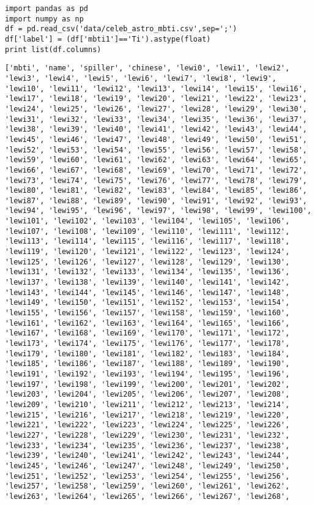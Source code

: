 \documentclass[12pt,fleqn]{article}\usepackage{../common}
\begin{document}
\begin{verbatim}
import pandas as pd
import numpy as np
df = pd.read_csv('data/celeb_astro_mbti.csv',sep=';')
df['label'] = (df['mbti1']=='Ti').astype(float)
print list(df.columns)
\end{verbatim}

\begin{verbatim}
['mbti', 'name', 'spiller', 'chinese', 'lewi0', 'lewi1', 'lewi2', 'lewi3', 'lewi4', 'lewi5', 'lewi6', 'lewi7', 'lewi8', 'lewi9', 'lewi10', 'lewi11', 'lewi12', 'lewi13', 'lewi14', 'lewi15', 'lewi16', 'lewi17', 'lewi18', 'lewi19', 'lewi20', 'lewi21', 'lewi22', 'lewi23', 'lewi24', 'lewi25', 'lewi26', 'lewi27', 'lewi28', 'lewi29', 'lewi30', 'lewi31', 'lewi32', 'lewi33', 'lewi34', 'lewi35', 'lewi36', 'lewi37', 'lewi38', 'lewi39', 'lewi40', 'lewi41', 'lewi42', 'lewi43', 'lewi44', 'lewi45', 'lewi46', 'lewi47', 'lewi48', 'lewi49', 'lewi50', 'lewi51', 'lewi52', 'lewi53', 'lewi54', 'lewi55', 'lewi56', 'lewi57', 'lewi58', 'lewi59', 'lewi60', 'lewi61', 'lewi62', 'lewi63', 'lewi64', 'lewi65', 'lewi66', 'lewi67', 'lewi68', 'lewi69', 'lewi70', 'lewi71', 'lewi72', 'lewi73', 'lewi74', 'lewi75', 'lewi76', 'lewi77', 'lewi78', 'lewi79', 'lewi80', 'lewi81', 'lewi82', 'lewi83', 'lewi84', 'lewi85', 'lewi86', 'lewi87', 'lewi88', 'lewi89', 'lewi90', 'lewi91', 'lewi92', 'lewi93', 'lewi94', 'lewi95', 'lewi96', 'lewi97', 'lewi98', 'lewi99', 'lewi100', 'lewi101', 'lewi102', 'lewi103', 'lewi104', 'lewi105', 'lewi106', 'lewi107', 'lewi108', 'lewi109', 'lewi110', 'lewi111', 'lewi112', 'lewi113', 'lewi114', 'lewi115', 'lewi116', 'lewi117', 'lewi118', 'lewi119', 'lewi120', 'lewi121', 'lewi122', 'lewi123', 'lewi124', 'lewi125', 'lewi126', 'lewi127', 'lewi128', 'lewi129', 'lewi130', 'lewi131', 'lewi132', 'lewi133', 'lewi134', 'lewi135', 'lewi136', 'lewi137', 'lewi138', 'lewi139', 'lewi140', 'lewi141', 'lewi142', 'lewi143', 'lewi144', 'lewi145', 'lewi146', 'lewi147', 'lewi148', 'lewi149', 'lewi150', 'lewi151', 'lewi152', 'lewi153', 'lewi154', 'lewi155', 'lewi156', 'lewi157', 'lewi158', 'lewi159', 'lewi160', 'lewi161', 'lewi162', 'lewi163', 'lewi164', 'lewi165', 'lewi166', 'lewi167', 'lewi168', 'lewi169', 'lewi170', 'lewi171', 'lewi172', 'lewi173', 'lewi174', 'lewi175', 'lewi176', 'lewi177', 'lewi178', 'lewi179', 'lewi180', 'lewi181', 'lewi182', 'lewi183', 'lewi184', 'lewi185', 'lewi186', 'lewi187', 'lewi188', 'lewi189', 'lewi190', 'lewi191', 'lewi192', 'lewi193', 'lewi194', 'lewi195', 'lewi196', 'lewi197', 'lewi198', 'lewi199', 'lewi200', 'lewi201', 'lewi202', 'lewi203', 'lewi204', 'lewi205', 'lewi206', 'lewi207', 'lewi208', 'lewi209', 'lewi210', 'lewi211', 'lewi212', 'lewi213', 'lewi214', 'lewi215', 'lewi216', 'lewi217', 'lewi218', 'lewi219', 'lewi220', 'lewi221', 'lewi222', 'lewi223', 'lewi224', 'lewi225', 'lewi226', 'lewi227', 'lewi228', 'lewi229', 'lewi230', 'lewi231', 'lewi232', 'lewi233', 'lewi234', 'lewi235', 'lewi236', 'lewi237', 'lewi238', 'lewi239', 'lewi240', 'lewi241', 'lewi242', 'lewi243', 'lewi244', 'lewi245', 'lewi246', 'lewi247', 'lewi248', 'lewi249', 'lewi250', 'lewi251', 'lewi252', 'lewi253', 'lewi254', 'lewi255', 'lewi256', 'lewi257', 'lewi258', 'lewi259', 'lewi260', 'lewi261', 'lewi262', 'lewi263', 'lewi264', 'lewi265', 'lewi266', 'lewi267', 'lewi268', 
\end{verbatim}
\end{document}
